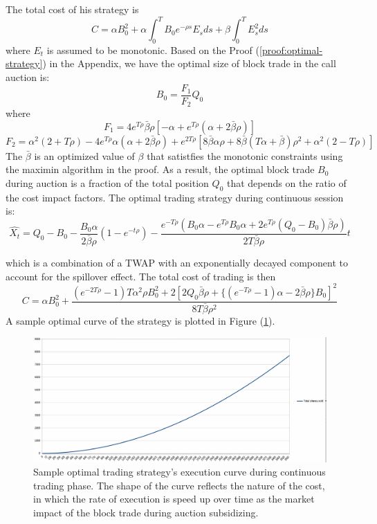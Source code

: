 \documentclass{article}
\begin{document}
The total cost of his strategy is
\[
  C = \alpha B_0^2  + \alpha \int_0^T B_0 e^{-\rho s} E_s ds + \beta \int_0^T E_s^2 ds
\]
where $E_t$ is assumed to be monotonic. Based on the Proof (\ref{proof:optimal-strategy}) in the Appendix, we have the optimal size of block trade in the call auction is:
\[
  B_0 = \frac{F_1}{F_2} Q_0
\]
where
\[
  F_1 = 4 e^{T \rho} \bar{\beta} \rho [-\alpha + e^{T \rho} (\alpha + 2 \bar{\beta} \rho)]
\]
\[
  F_2 = \alpha^2 (2 + T \rho) - 4 e^{T \rho} \alpha (\alpha + 2 \bar{\beta} \rho)
  + e^{2 T \rho} [8 \bar{\beta} \alpha \rho + 8 \bar{\beta} (T \alpha + \bar{\beta}) \rho^2 + \alpha^2 (2 - T \rho)]
\]
The $\bar{\beta}$ is an optimized value of $\beta$ that satistfies the monotonic constraints using the maximin algorithm in the proof. As a result, the optimal block trade $B_0$ during auction is a fraction of the total position $Q_0$ that depends on the ratio of the cost impact factors. The optimal trading strategy during continuous session is:
\[
  \hat{X_t} = Q_0 - B_0  - \frac{B_0 \alpha}{2 \bar{\beta} \rho}(1 - e^{-t \rho}) - \frac{e^{-T \rho} (B_0 \alpha - e^{T \rho}B_0 \alpha + 2 e^{T \rho} (Q_0 - B_0) \bar{\beta} \rho )}{2 T \bar{\beta} \rho} t
\]

which is a combination of a TWAP with an exponentially decayed component to account for the spillover effect. The total cost of trading is then
\[
  C = \alpha B_0^2 + \frac{(e^{-2 T \rho} - 1) T \alpha^2 \rho B_0^2 + 2 [2 Q_0 \bar{\beta} \rho + \{(e^{-T \rho} - 1) \alpha - 2 \bar{\beta} \rho\} B_0]^2}{8 T \bar{\beta} \rho^2}
\]
A sample optimal curve of the strategy is plotted in Figure (\ref{fig:optimal_curve_strategy}).

\begin{figure}[h]
  \includegraphics[width=\textwidth]{OptimalStrategyCurve}
  \caption{Sample optimal trading strategy's execution curve during continuous trading phase. The shape of the curve reflects the nature of the cost, in which the rate of execution is speed up over time as the market impact of the block trade during auction subsidizing.}
  \label{fig:optimal_curve_strategy}
\end{figure}
\end{document}
